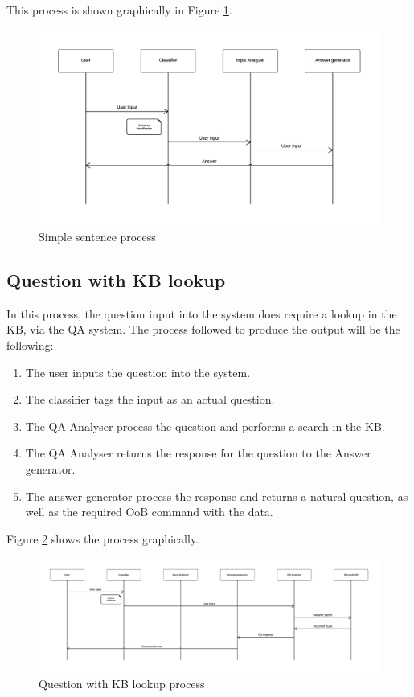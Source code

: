 This process is shown graphically in Figure \ref{fig:arch2}.

\begin{figure}[!htbp]
    \centering
    \includegraphics[width=\textwidth]{img/arch/SimpleSentence.png}
    \caption{Simple sentence process}
    \label{fig:arch2}
\end{figure}

\subsection{Question with \ac{KB} lookup}

In this process, the question input into the system does require a lookup in the \ac{KB}, via the \ac{QA} system. The process followed to produce the output will be the following:

\begin{enumerate}
 \item The user inputs the question into the system.
 \item The classifier tags the input as an actual question.
 \item The QA Analyser process the question and performs a search in the \ac{KB}.
 \item The QA Analyser returns the response for the question to the Answer generator.
 \item The answer generator process the response and returns a natural question, as well as the required \ac{OoB} command with the data.
\end{enumerate}

Figure \ref{fig:arch3} shows the process graphically.

\begin{figure}[!htbp]
    \centering
    \includegraphics[width=\textwidth]{img/arch/FullQuestion.png}
    \caption{Question with \ac{KB} lookup process}
    \label{fig:arch3}
\end{figure}

